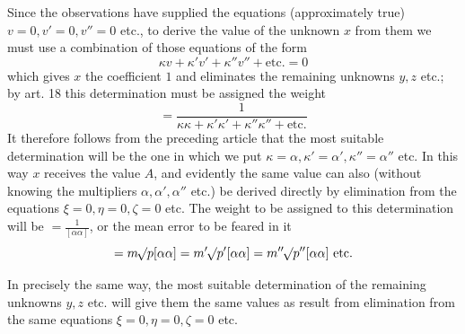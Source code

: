 Since the observations have supplied the equations (approximately true) \(v=0,v'=0,v''=0\) etc., to derive the value of the unknown \(x\) from them we must use a combination of those equations of the form
\[
\kappa v+\kappa'v'+\kappa''v''+\text{etc.}=0
\]
which gives \(x\) the coefficient \(1\) and eliminates the remaining unknowns \(y,z\) etc.; by art. 18 this determination must be assigned the weight
\[
=\frac1{\kappa\kappa+\kappa'\kappa'+\kappa''\kappa''+\text{etc.}}
\]
It therefore follows from the preceding article that the most suitable determination will be the one in which we put \(\kappa=\alpha,\kappa'=\alpha',\kappa''=\alpha''\) etc. In this way \(x\) receives the value \(A\), and evidently the same value can also (without knowing the multipliers \(\alpha,\alpha',\alpha''\) etc.) be derived directly by elimination from the equations \(\xi=0,\eta=0,\zeta=0\) etc. The weight to be assigned to this determination will be \(=\frac1{[\alpha\alpha]}\), or the mean error to be feared in it
\[
=m\mathord{{}^{}\!\surd}p[\alpha\alpha]=m'\mathord{{}^{}\!\surd}p'[\alpha\alpha]=m''\mathord{{}^{}\!\surd}p''[\alpha\alpha]\text{ etc.}
\]

In precisely the same way, the most suitable determination of the remaining unknowns \(y,z\) etc. will give them the same values as result from elimination from the same equations \(\xi=0,\eta=0,\zeta=0\) etc.

